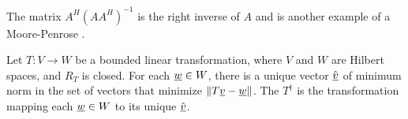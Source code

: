 The matrix $A^H \left( A A^H \right)^{-1}$ is the right inverse of $A$ and is another example of a Moore-Penrose .

\begin{definition}
Let $T \colon V \rightarrow W$ be a bounded linear transformation, where $V$ and $W$ are Hilbert spaces, and $R_T$ is closed.
For each $\underline{w} \in W$, there is a unique vector $\hat{\underline{v}}$ of minimum norm in the set of vectors that minimize $\left\| T \underline{v} - \underline{w} \right\|$.
The  $T^{\dagger}$ is the transformation mapping each $\underline{w}\in W$ to its unique $\hat{\underline{v}}$.
\end{definition}
